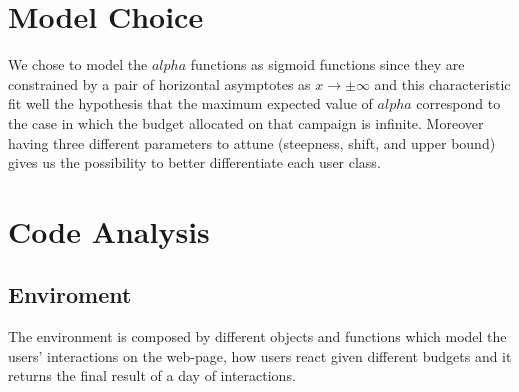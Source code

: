 \section{Model Choice}
\label{sec:env_Motivation}

We chose to model the $alpha$ functions as sigmoid functions since they are constrained by a pair of horizontal asymptotes as $ x\to\pm\infty$  and this characteristic fit well the hypothesis that the maximum expected value of $alpha$ correspond to the case in which the budget allocated on that campaign is infinite. Moreover having three different parameters to attune (steepness, shift, and upper bound) gives us the possibility to better differentiate each user class.

\section{Code Analysis}
\label{sec:env_Code Analysis}

    \subsection{Enviroment}
    The environment is composed by different objects and functions which model the users' interactions on the web-page, how users react given different budgets and it returns the final result of a day of interactions.
 
